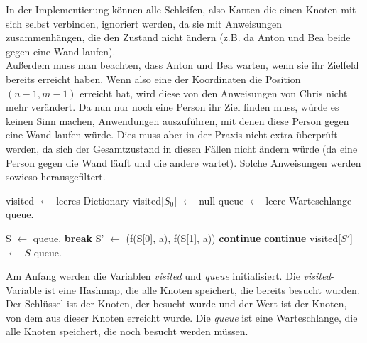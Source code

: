 \documentclass[a4paper,10pt,ngerman]{scrartcl}
\begin{document}
    In der Implementierung können alle Schleifen, also Kanten die einen Knoten mit sich selbst verbinden, ignoriert werden, da sie mit Anweisungen zusammenhängen, die den Zustand nicht ändern (z.B. da Anton und Bea beide gegen eine Wand laufen). \\
    Außerdem muss man beachten, dass Anton und Bea warten, wenn sie ihr Zielfeld bereits erreicht haben. Wenn also eine der Koordinaten die Position $(n-1,m-1)$ erreicht hat, wird diese von den Anweisungen von Chris nicht mehr verändert. Da nun nur noch eine Person ihr Ziel finden muss, würde es keinen Sinn machen, Anwendungen auszuführen, mit denen diese Person gegen eine Wand laufen würde. Dies muss aber in der Praxis nicht extra überprüft werden, da sich der Gesamtzustand in diesen Fällen nicht ändern würde (da eine Person gegen die Wand läuft und die andere wartet). Solche Anweisungen werden sowieso herausgefiltert.
        \begin{algorithm}[H]
        \begin{algorithmic}[1]
                \State visited $\gets$ leeres Dictionary
                \State visited[$S_0$] $\gets$ null
                \State queue $\gets$ leere Warteschlange
                \State queue.

                    \State S $\gets$ queue.
                        \State \textbf{break}
                    \EndIf
                        \State S' $\gets$ (f(S[0], a), f(S[1], a))
                            \State \textbf{continue}
                        \EndIf
                            \State \textbf{continue}
                        \EndIf
                        \State visited[$S'$] $\gets$ $S$
                        \State queue.
                    \EndFor
                \EndWhile
                    \State {}
                \Else
                    \State \Return {}
                \EndIf
            \EndFunction
        \end{algorithmic}\label{alg:bfs}
    \end{algorithm}
    Am Anfang werden die Variablen \textit{visited} und \textit{queue} initialisiert. Die \textit{visited}-Variable ist eine Hashmap, die alle Knoten speichert, die bereits besucht wurden. Der Schlüssel ist der Knoten, der besucht wurde und der Wert ist der Knoten, von dem aus dieser Knoten erreicht wurde. Die \textit{queue} ist eine Warteschlange, die alle Knoten speichert, die noch besucht werden müssen.\\
\end{document}
